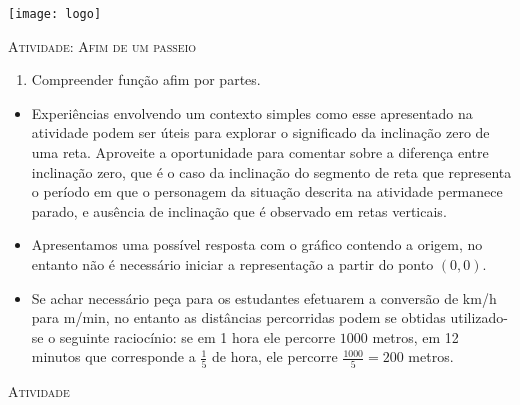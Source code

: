 \documentclass[10 pt,usenames,dvipsnames, oneside]{article}
\begin{document}
\begin{center}
  \begin{minipage}[l]{3cm}
\texttt{[image: logo]}    
\end{minipage}\hfill
\begin{minipage}[r]{.8\textwidth}
 {\Large \scshape Atividade: Afim de um passeio}  
\end{minipage}
\end{center}
\vspace{.2cm}

\ifdefined\prof
\begin{objetivos}
\item \phantom{a}
\end{objetivos}

\begin{goals}
\begin{enumerate}
\item Compreender função afim por partes.
\end{enumerate}

\tcblower

\begin{itemize}
\item Experiências envolvendo um contexto simples como esse apresentado na atividade podem ser úteis para explorar o significado da inclinação zero de uma reta. Aproveite a oportunidade para comentar sobre a diferença entre inclinação zero, que é o caso da inclinação do segmento de reta que representa o período em que o personagem da situação descrita na atividade permanece parado, e ausência de inclinação que é observado em retas verticais.
\item Apresentamos uma possível resposta com o gráfico contendo a origem, no entanto não é necessário iniciar a representação a partir do ponto $(0,0)$.
\item Se achar necessário peça para os estudantes efetuarem a conversão de km/h para m/min, no entanto as distâncias percorridas podem se obtidas utilizado-se o seguinte raciocínio: se em 1 hora ele percorre $1000$ metros, em 12 minutos que corresponde a $\displaystyle\frac{1}{5}$ de hora, ele percorre $\displaystyle\frac{1000}{5}=200$ metros.
\end{itemize}
\end{goals}

\bigskip
\begin{center}
{\large \scshape Atividade}
\end{center}
\fi
\end{document}

